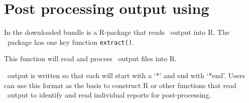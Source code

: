 \section{Post processing output using \R \label{sec:post-processing}}

In the downloaded bundle is a R-package that reads \CNAME\ output into R. The \CNAME\ package has one key function \texttt{extract()}.

This function will read and process \CNAME\ output files into R. 

\CNAME\ output is written so that each  will start with a `*' and end with `*end'. Users can use this format as the basis to construct R or other functions that read \CNAME\ output to identify and read individual reports for post-processing.
